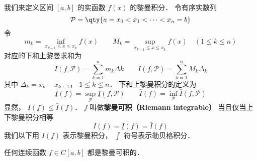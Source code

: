
我们来定义区间 $[a, b]$ 的实函数 $f(x)$ 的黎曼积分． 令有序实数列
\begin{equation}
\mathcal P = \qty{a = x_0 < x_1 < \dots < x_n = b}
\end{equation}
令
\begin{equation}
m_k = \inf_{x_{k-1} \le x \le x_k} f(x) \qquad M_k = \sup_{x_{k-1} \le x \le x_k} f(x) \quad (1 \le k \le n)
\end{equation}
对应的下和上黎曼求和为
\begin{equation}
\underline I(f, \mathcal P) = \sum_{k = 1}^n m_k\Delta k \qquad \bar I(f, \mathcal P) = \sum_{k = 1}^n M_k \Delta_k
\end{equation}
其中 $\Delta_k = x_k - x_{k-1}$， $1\le k\le n$． 下和上黎曼积分的定义为
\begin{equation}
\underline I(f) = \sup_{\mathcal P} \underline I(f, \mathcal P) \qquad \bar I(f) = \inf_{\mathcal P} \bar I(f, \mathcal P)
\end{equation}
显然， $\underline I(f) \le \bar I(f)$． $f$ 叫做\textbf{黎曼可积（Riemann integrable）} 当且仅当上下黎曼积分相等
\begin{equation}
I(f) = \underline I(f) = \bar I(f)
\end{equation}
我们以下用 $I(f)$ 表示黎曼积分， $\int$ 符号表示勒贝格积分．

\begin{theorem}{}
任何连续函数 $f \in C[a, b]$ 都是黎曼可积的．
\end{theorem}
